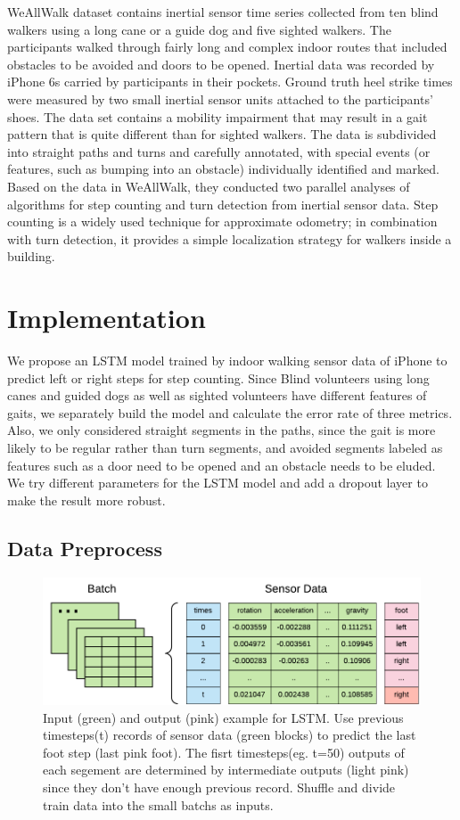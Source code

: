 \documentclass[11pt]{article}
\begin{document}
{WeAllWalk dataset \cite{flores2016weallwalk} contains inertial sensor time series collected from ten blind walkers using a long cane or a guide dog and five sighted walkers. The participants walked through fairly long and complex indoor routes that included obstacles to be avoided and doors to be opened. Inertial data was recorded by iPhone 6s carried by participants in their pockets. Ground truth heel strike times were measured by two small inertial sensor units attached to the participants’ shoes. The data set contains a mobility impairment that may result in a gait pattern that is quite different than for sighted walkers. The data is subdivided into straight paths and turns and carefully annotated, with special events (or features, such as bumping into an obstacle) individually identified and marked. Based on the data in WeAllWalk, they conducted two parallel analyses of algorithms for step counting and turn detection from inertial sensor data. Step counting is a widely used technique for approximate odometry; in combination with turn detection, it provides a simple localization strategy for walkers inside a building. 


\section{Implementation}
We propose an LSTM model trained by indoor walking sensor data of iPhone to predict left or right steps for step counting. Since Blind volunteers using long canes and guided dogs as well as sighted volunteers have different features of gaits, we separately build the model and calculate the error rate of three metrics. Also, we only considered straight segments in the paths, since the gait is more likely to be regular rather than turn segments, and avoided segments labeled as features such as a door need to be opened and an obstacle needs to be eluded. We try different parameters for the LSTM model and add a dropout layer to make the result more robust.

\subsection{Data Preprocess}

\begin{figure}[ht]
\centering
\includegraphics[scale=1]{input2}
\caption{Input (green) and output (pink) example for LSTM. Use previous timesteps(t) records of sensor data (green blocks) to predict the last foot step (last pink foot). The fisrt timesteps(eg. t=50) outputs of each segement are determined by intermediate outputs (light pink) since they don't have enough previous record. Shuffle and divide train data into the small batchs as inputs.}
\label{fig:batch_sensor_data}
\end{figure}

}
\end{document}
